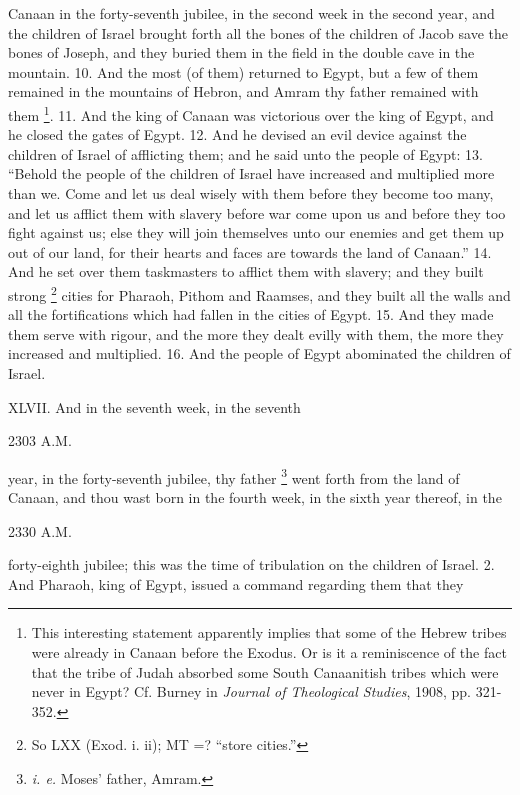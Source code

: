 Canaan in the forty-seventh jubilee, in the second week in the second year, and the children of Israel brought forth all the bones of the children of Jacob save the bones of Joseph, and they buried them in the field in the double cave in the mountain. 10. And the most (of them) returned to Egypt, but a few of them remained in the mountains of Hebron, and Amram thy father remained with them \footnote{This interesting statement apparently implies that some of the Hebrew tribes were already in Canaan before the Exodus. Or is it a reminiscence of the fact that the tribe of Judah absorbed some South Canaanitish tribes which were never in Egypt? Cf. Burney in \emph{Journal of Theological Studies}, 1908, pp. 321-352.}. 11. And the king of Canaan was victorious over the king of Egypt, and he closed the gates of Egypt. 12. And he devised an evil device against the children of Israel of afflicting them; and he said unto the people of Egypt: 13. ``Behold the people of the children of Israel have increased and multiplied more than we. Come and let us deal wisely with them before they become too many, and let us afflict them with slavery before war come upon us and before they too fight against us; else they will join themselves unto our enemies and get them up out of our land, for their hearts and faces are towards the land of Canaan.'' 14. And he set over them taskmasters to afflict them with slavery; and they built strong \footnote{So LXX (Exod. i. ii); MT =? ``store cities.''} cities for Pharaoh, Pithom and Raamses, and they built all the walls and all the fortifications which had fallen in the cities of Egypt. 15. And they made them serve with rigour, and the more they dealt evilly with them, the more they increased and multiplied. 16. And the people of Egypt abominated the children of Israel.


XLVII. And in the seventh week, in the seventh

2303 A.M.

year, in the forty-seventh jubilee, thy father \footnote{\emph{i. e.} Moses' father, Amram.} went forth from the land of Canaan, and thou wast born in the fourth week, in the sixth year thereof, in the

2330 A.M.

forty-eighth jubilee; this was the time of tribulation on the children of Israel. 2. And Pharaoh, king of Egypt, issued a command regarding them that they

